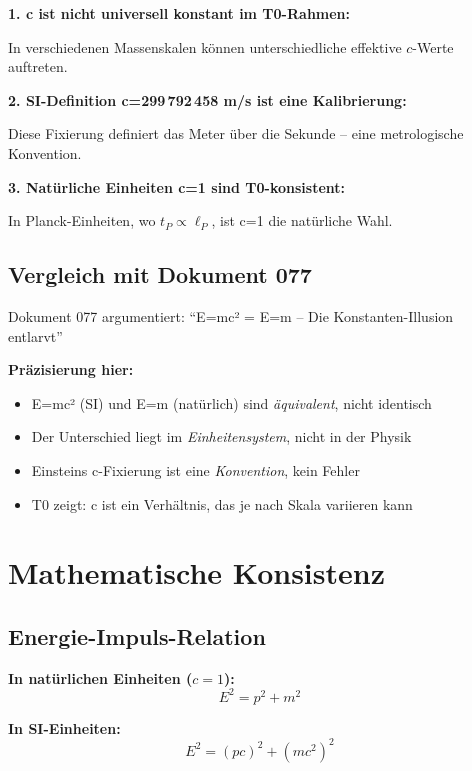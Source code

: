	\textbf{1. c ist nicht universell konstant im T0-Rahmen:}
	
	In verschiedenen Massenskalen können unterschiedliche effektive $c$-Werte auftreten.
	
	\textbf{2. SI-Definition c=299\,792\,458 m/s ist eine Kalibrierung:}
	
	Diese Fixierung definiert das Meter über die Sekunde -- eine metrologische Konvention.
	
	\textbf{3. Natürliche Einheiten c=1 sind T0-konsistent:}
	
	In Planck-Einheiten, wo $t_P \propto \ell_P$, ist c=1 die natürliche Wahl.
	
	\subsection{Vergleich mit Dokument 077}
	
	Dokument 077 argumentiert: ``E=mc² = E=m -- Die Konstanten-Illusion entlarvt''
	
	\textbf{Präzisierung hier:}
	\begin{itemize}
		\item E=mc² (SI) und E=m (natürlich) sind \emph{äquivalent}, nicht identisch
		\item Der Unterschied liegt im \emph{Einheitensystem}, nicht in der Physik
		\item Einsteins c-Fixierung ist eine \emph{Konvention}, kein Fehler
		\item T0 zeigt: c ist ein Verhältnis, das je nach Skala variieren kann
	\end{itemize}
	
	\section{Mathematische Konsistenz}
	
	\subsection{Energie-Impuls-Relation}
	
	\textbf{In natürlichen Einheiten ($c=1$):}
	\begin{equation}
		E^2 = p^2 + m^2
	\end{equation}
	
	\textbf{In SI-Einheiten:}
	\begin{equation}
		E^2 = (pc)^2 + (mc^2)^2
	\end{equation}
	
